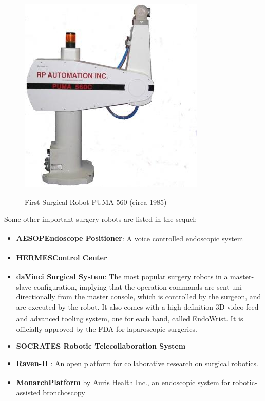 \begin{center}
\begin{figure}[!htb]
\centering
\includegraphics{images/Puma560.jpg}\\
\caption{First Surgical Robot PUMA 560 (circa 1985)}
\end{figure}
\end{center}

Some other important surgery robots are listed in the sequel:
\begin{itemize}
\item \textbf{AESOP\textsuperscript \textregistered Endoscope Positioner}: A voice controlled endoscopic system
\item \textbf{HERMES\textsuperscript \textregistered Control Center}
\item \textbf{daVinci Surgical System\textsuperscript \textregistered}: The  most popular surgery robots in a master-slave configuration, implying that the operation commands are sent uni-directionally from the master console, which is controlled by the surgeon, and are executed by the robot. It also comes with a high definition 3D video feed and advanced tooling system, one for each hand, called EndoWrist\textsuperscript \textregistered. It is officially approved 
by the FDA for laparoscopic surgeries.
\item \textbf{SOCRATES Robotic Telecollaboration System}
\item \textbf{Raven-II} \cite{Raven2}: An open platform for collaborative research on surgical robotics.
\item \textbf{Monarch\textsuperscript \texttrademark Platform} by Auris Health Inc., an endoscopic system for robotic-assisted bronchoscopy
\end{itemize}

